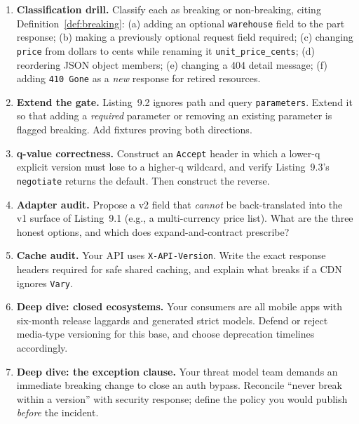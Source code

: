\begin{enumerate}[label=\textbf{E9.\arabic*.}, leftmargin=2.2cm]
  \item \textbf{Classification drill.} Classify each as breaking or
        non-breaking, citing Definition~\ref{def:breaking}: (a) adding an
        optional \texttt{warehouse} field to the part response; (b) making a
        previously optional request field required; (c) changing
        \texttt{price} from dollars to cents while renaming it
        \texttt{unit\_price\_cents}; (d) reordering JSON object members;
        (e) changing a 404 detail message; (f) adding \texttt{410 Gone} as a
        \emph{new} response for retired resources.
  \item \textbf{Extend the gate.} Listing~9.2 ignores path and query
        \texttt{parameters}. Extend it so that adding a \emph{required}
        parameter or removing an existing parameter is flagged breaking.
        Add fixtures proving both directions.
  \item \textbf{q-value correctness.} Construct an \texttt{Accept} header in
        which a lower-q explicit version must lose to a higher-q wildcard,
        and verify Listing~9.3's \texttt{negotiate} returns the default.
        Then construct the reverse.
  \item \textbf{Adapter audit.} Propose a v2 field that \emph{cannot} be
        back-translated into the v1 surface of Listing~9.1 (e.g., a
        multi-currency price list). What are the three honest options, and
        which does expand-and-contract prescribe?
  \item \textbf{Cache audit.} Your API uses \texttt{X-API-Version}. Write the
        exact response headers required for safe shared caching, and explain
        what breaks if a CDN ignores \texttt{Vary}.
  \item \textbf{Deep dive: closed ecosystems.} Your consumers are all mobile
        apps with six-month release laggards and generated strict models.
        Defend or reject media-type versioning for this base, and choose
        deprecation timelines accordingly.
  \item \textbf{Deep dive: the exception clause.} Your threat model team
        demands an immediate breaking change to close an auth bypass.
        Reconcile ``never break within a version'' with security response;
        define the policy you would publish \emph{before} the incident.
\end{enumerate}

